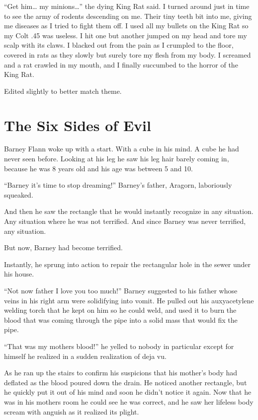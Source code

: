 ``Get him{\ldots} my minions{\ldots}'' the dying King Rat said. I turned around
just in time to see the army of rodents descending on me. Their
tiny teeth bit into me, giving me diseases as I tried to fight them
off. I used all my bullets on the King Rat so my Colt .45 was
useless. I hit one but another jumped on my head and tore my scalp
with its claws. I blacked out from the pain as I crumpled to the
floor, covered in rats as they slowly but surely tore my flesh from
my body. I screamed and a rat crawled in my mouth, and I finally
succumbed to the horror of the King Rat.







Edited slightly to better match theme. 

 



\chapter{The Six Sides of Evil}


Barney Flann woke up with a start. With a cube in his mind. A cube
he had never seen before. Looking at his leg he saw his leg hair
barely coming in, because he was 8 years old and his age was
between 5 and 10.

``Barney it's time to stop dreaming!'' Barney's father, Aragorn,
laboriously squeaked.

And then he saw the rectangle that he would instantly recognize in
any situation. Any situation where he was not terrified. And since
Barney was never terrified, any situation.

But now, Barney had become terrified.

Instantly, he sprung into action to repair the rectangular hole in
the sewer under his house.

``Not now father I love you too much!'' Barney suggested to his
father whose veins in his right arm were solidifying into vomit. He
pulled out his auxyacetylene welding torch that he kept on him so
he could weld, and used it to burn the blood that was coming
through the pipe into a solid mass that would fix the pipe.

``That was my mothers blood!'' he yelled to nobody in particular
except for himself he realized in a sudden realization of deja
vu.

As he ran up the stairs to confirm his suspicions that his mother's
body had deflated as the blood poured down the drain. He noticed
another rectangle, but he quickly put it out of his mind and soon
he didn't notice it again. Now that he was in his mothers room he
could see he was correct, and he saw her lifeless body scream with
anguish as it realized its plight.

